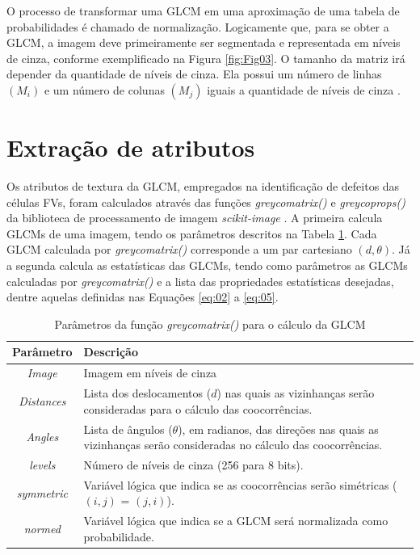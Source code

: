 \documentclass[a4paper]{ifacconf}
\begin{document}
O processo de transformar uma GLCM em uma aproximação de uma tabela de probabilidades é chamado de normalização. Logicamente que, para se obter a GLCM, a imagem deve primeiramente ser segmentada e representada em níveis de cinza, conforme exemplificado na Figura \ref{fig:Fig03}. O tamanho da matriz irá depender da quantidade de níveis de cinza. Ela possui um número de linhas $(M_i)$ e um número de colunas $(M_j)$ iguais a quantidade de níveis de cinza \citep{HARALICK1992}. 

\section{Extração de atributos}

Os atributos de textura da GLCM, empregados na identificação de defeitos das células FVs, foram calculados através das funções \textit{greycomatrix()} e \textit{greycoprops()} da biblioteca de processamento de imagem \textit{scikit-image} \citep{van_der_Walt_2014}. A primeira calcula  GLCMs de uma imagem, tendo os parâmetros descritos na Tabela \ref{Tab:00}. Cada GLCM calculada por \textit{greycomatrix()} corresponde a um par cartesiano $(d,\theta)$. Já a segunda calcula as estatísticas das GLCMs, tendo como parâmetros as GLCMs calculadas por \textit{greycomatrix()} e a lista das propriedades estatísticas desejadas, dentre aquelas definidas nas Equações \ref{eq:02} a \ref{eq:05}.


\begin{table}[h]	
	\centering
	\caption{Parâmetros da função \textit{greycomatrix()} para o cálculo da GLCM}\label{Tab:00}
		\begin{tabular}{cp{}}
		   \hline \textbf{Parâmetro} & \textbf{Descrição} \\ \hline
			 \textit{Image} & Imagem em níveis de cinza\\
			 \textit{Distances} & Lista dos deslocamentos ($d$) nas quais as vizinhanças serão consideradas para o cálculo das coocorrências. \\
          \textit{Angles} & Lista de ângulos ($\theta$), em radianos, das direções nas quais as vizinhanças serão consideradas no cálculo das coocorrências.\\
          \textit{levels} &Número de níveis de cinza (256 para 8 bits).\\
			 \textit{symmetric} & Variável lógica que indica se as coocorrências serão simétricas ($(i, j)$ = $(j, i)$).\\
			 \textit{normed} & Variável lógica que indica  se a GLCM será normalizada como probabilidade.\\
			 \hline
		\end{tabular}
\end{table}
\end{document}
